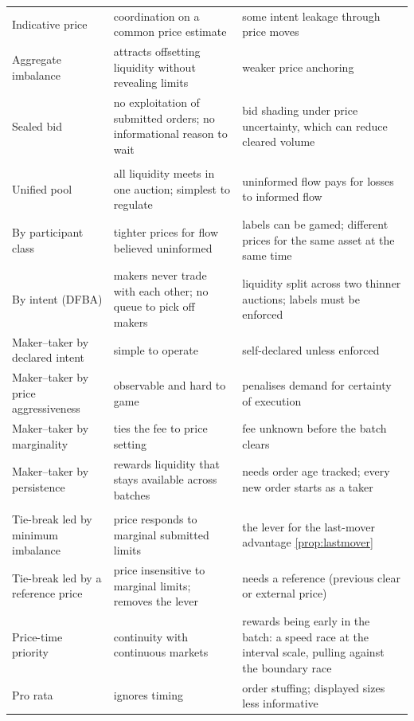 \begin{longtable}{@{}>{\raggedright\arraybackslash}p{3.2cm}
  >{\raggedright\arraybackslash}p{7.2cm}
  >{\raggedright\arraybackslash}p{5.6cm}@{}}
Indicative price &
coordination on a common price estimate &
some intent leakage through price moves\\
Aggregate imbalance &
attracts offsetting liquidity without revealing limits &
weaker price anchoring\\
Sealed bid &
no exploitation of submitted orders; no informational reason to wait &
bid shading under price uncertainty, which can reduce cleared volume\\
\midrule
\multicolumn{3}{@{}l}{\emph{Block 3: order flow segregation (\Cref{sec:segregation})}}\\
Unified pool &
all liquidity meets in one auction; simplest to regulate &
uninformed flow pays for losses to informed flow\\
By participant class &
tighter prices for flow believed uninformed &
labels can be gamed; different prices for the same asset at the same time\\
By intent (DFBA) &
makers never trade with each other; no queue to pick off makers &
liquidity split across two thinner auctions; labels must be enforced\\
Maker--taker by declared intent &
simple to operate &
self-declared unless enforced\\
Maker--taker by price aggressiveness &
observable and hard to game &
penalises demand for certainty of execution\\
Maker--taker by marginality &
ties the fee to price setting &
fee unknown before the batch clears\\
Maker--taker by persistence &
rewards liquidity that stays available across batches &
needs order age tracked; every new order starts as a taker\\
\midrule
\multicolumn{3}{@{}l}{\emph{Block 4: clearing and rationing (\Cref{sec:clearing})}}\\
Tie-break led by minimum imbalance &
price responds to marginal submitted limits &
the lever for the last-mover advantage \eqref{prop:lastmover}\\
Tie-break led by a reference price &
price insensitive to marginal limits; removes the lever &
needs a reference (previous clear or external price)\\
Price-time priority &
continuity with continuous markets &
rewards being early in the batch: a speed race at the interval scale, pulling against the boundary race\\
Pro rata &
ignores timing &
order stuffing; displayed sizes less informative\\

\end{longtable}
